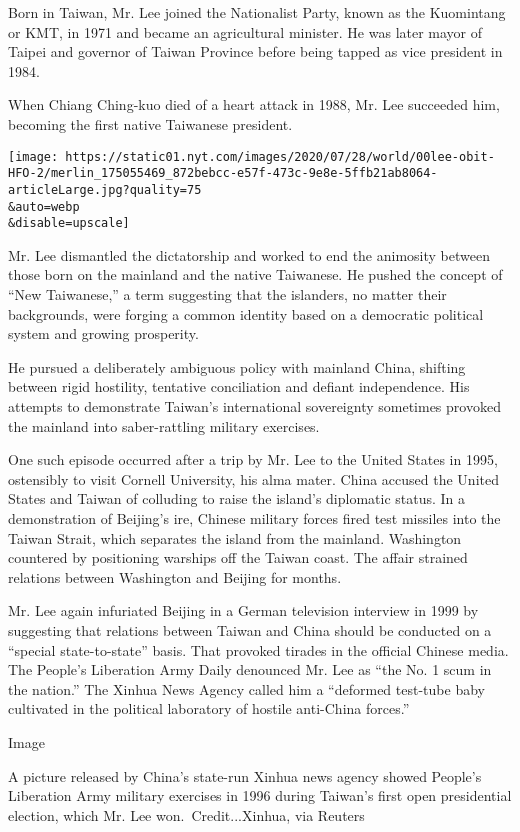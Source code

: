 Born in Taiwan, Mr. Lee joined the Nationalist Party, known as the
Kuomintang or KMT, in 1971 and became an agricultural minister. He was
later mayor of Taipei and governor of Taiwan Province before being
tapped as vice president in 1984.

When Chiang Ching-kuo died of a heart attack in 1988, Mr. Lee succeeded
him, becoming the first native Taiwanese president.

\texttt{[image: https://static01.nyt.com/images/2020/07/28/world/00lee-obit-HFO-2/merlin\_175055469\_872bebcc-e57f-473c-9e8e-5ffb21ab8064-articleLarge.jpg?quality=75\\\&auto=webp\\\&disable=upscale]}

Mr. Lee dismantled the dictatorship and worked to end the animosity
between those born on the mainland and the native Taiwanese. He pushed
the concept of ``New Taiwanese,'' a term suggesting that the islanders,
no matter their backgrounds, were forging a common identity based on a
democratic political system and growing prosperity.

He pursued a deliberately ambiguous policy with mainland China, shifting
between rigid hostility, tentative conciliation and defiant
independence. His attempts to demonstrate Taiwan's international
sovereignty sometimes provoked the mainland into saber-rattling military
exercises.

One such episode occurred after a trip by Mr. Lee to the United States
in 1995, ostensibly to visit Cornell University, his alma mater. China
accused the United States and Taiwan of colluding to raise the island's
diplomatic status. In a demonstration of Beijing's ire, Chinese military
forces fired test missiles into the Taiwan Strait, which separates the
island from the mainland. Washington countered by positioning warships
off the Taiwan coast. The affair strained relations between Washington
and Beijing for months.

Mr. Lee again infuriated Beijing in a German television interview in
1999 by suggesting that relations between Taiwan and China should be
conducted on a ``special state-to-state'' basis. That provoked tirades
in the official Chinese media. The People's Liberation Army Daily
denounced Mr. Lee as ``the No. 1 scum in the nation.'' The Xinhua News
Agency called him a ``deformed test-tube baby cultivated in the
political laboratory of hostile anti-China forces.''

Image

A picture released by China's state-run Xinhua news agency showed
People's Liberation Army military exercises in 1996 during Taiwan's
first open presidential election, which Mr. Lee won.~Credit...Xinhua,
via Reuters

